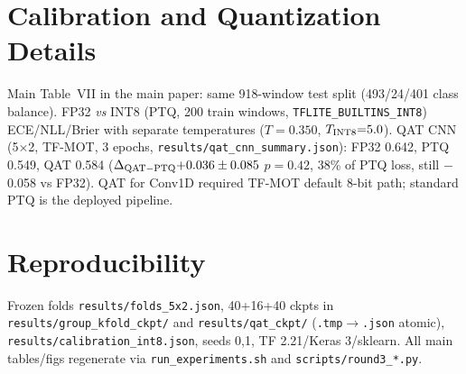 \documentclass[10pt, conference, letterpaper]{IEEEtran}
\begin{document}
\section{Calibration and Quantization Details}
Main Table~VII in the main paper: same 918-window test split (493/24/401 class balance). FP32 \textit{vs} INT8 (PTQ, 200 train windows, \texttt{TFLITE\_BUILTINS\_INT8}) ECE/NLL/Brier with separate temperatures ($T{=}0.350$, $T_{\rm INT8}{=}5.0$). QAT CNN (5$\times$2, TF-MOT, 3 epochs, \texttt{results/qat\_cnn\_summary.json}): FP32 0.642, PTQ 0.549, QAT 0.584 ($\Delta_{\rm QAT-PTQ}{+}0.036\pm0.085$ $p{=}0.42$, 38\% of PTQ loss, still $-$0.058 vs FP32). QAT for Conv1D required TF-MOT default 8-bit path; standard PTQ is the deployed pipeline.

\section{Reproducibility}
Frozen folds \texttt{results/folds\_5x2.json}, 40+16+40 ckpts in \texttt{results/group\_kfold\_ckpt/} and \texttt{results/qat\_ckpt/} (\texttt{.tmp$\rightarrow$.json} atomic), \texttt{results/calibration\_int8.json}, seeds 0,1, TF 2.21/Keras 3/sklearn. All main tables/figs regenerate via \texttt{run\_experiments.sh} and \texttt{scripts/round3\_*.py}.
\end{document}

